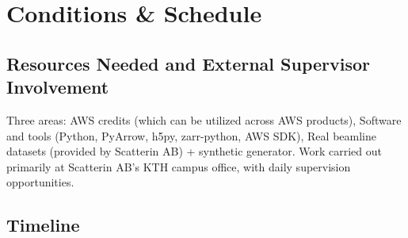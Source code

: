 \documentclass{article}
\begin{document}
\section{Conditions \& Schedule}

\subsection{Resources Needed and External Supervisor Involvement}
Three areas: AWS credits (which can be utilized across AWS products), Software and tools (Python, PyArrow, h5py, zarr-python, AWS SDK), Real beamline datasets (provided by Scatterin AB) + synthetic generator. Work carried out primarily at Scatterin AB’s KTH campus office, with daily supervision opportunities.

\subsection{Timeline}
\end{document}

